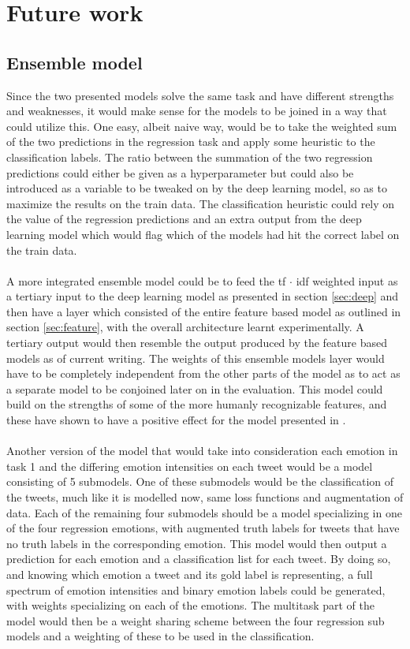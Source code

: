 
\section{Future work}

\subsection{Ensemble model}
Since the two presented models solve the same task and have different strengths and weaknesses, it would make sense for the models to be joined in a way that could utilize this. One easy, albeit naive way, would be to take the weighted sum of the two predictions in the regression task and apply some heuristic to the classification labels. The ratio between the summation of the two regression predictions could either be given as a hyperparameter but could also be introduced as a variable to be tweaked on by the deep learning model, so as to maximize the results on the train data. The classification heuristic could rely on the value of the regression predictions and an extra output from the deep learning model which would flag which of the models had hit the correct label on the train data.\\
\\
A more integrated ensemble model could be to feed the tf $\cdot$ idf weighted input as a tertiary input to the deep learning model as presented in section \ref{sec:deep} and then have a layer which consisted of the entire feature based model as outlined in section \ref{sec:feature}, with the overall architecture learnt experimentally. A tertiary output would then resemble the output produced by the feature based models as of current writing. The weights of this ensemble models layer would have to be completely independent from the other parts of the model as to act as a separate model to be conjoined later on in the evaluation. This model could build on the strengths of some of the more humanly recognizable features, and these have shown to have a positive effect for the model presented in \cite{ims}.\\
\\
Another version of the model that would take into consideration each emotion in task 1 and the differing emotion intensities on each tweet would be a model consisting of 5 submodels. One of these submodels would be the classification of the tweets, much like it is modelled now, same loss functions and augmentation of data. Each of the remaining four submodels should be a model specializing in one of the four regression emotions, with augmented truth labels for tweets that have no truth labels in the corresponding emotion. This model would then output a prediction for each emotion and a classification list for each tweet. By doing so, and knowing which emotion a tweet and its gold label is representing, a full spectrum of emotion intensities and binary emotion labels could be generated, with weights specializing on each of the emotions. The multitask part of the model would then be a weight sharing scheme between the four regression sub models and a weighting of these to be used in the classification.


